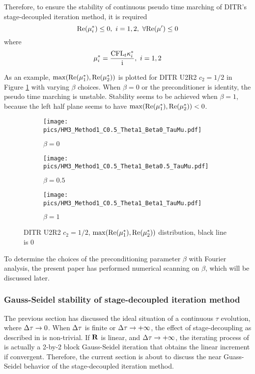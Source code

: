 Therefore, to ensure the stability of continuous pseudo time
marching of DITR's stage-decoupled iteration method, it is
required
\begin{equation}
    \mathrm{Re}(\mu^*_i) \leq 0,\  i = 1,2,\  \forall \mathrm{Re}(\mu') \leq 0
\end{equation}
where
\begin{equation}
    \mu^*_i = \frac{\text{CFL}_t\kappa^*_i}{\mathrm{i}},\ i=1,2
\end{equation}

As an example, $\max(\mathrm{Re}(\mu^*_1),\mathrm{Re}(\mu^*_2))$ is plotted for
DITR U2R2 $c_2=1/2$ in Figure \ref{fig:MuU2R2} with varying $\beta$ choices.
When $\beta = 0$ or the preconditioner is identity, the pseudo time marching is
unstable. Stability seems to be achieved when $\beta = 1$, because
the left half plane seems to have $\max(\mathrm{Re}(\mu^*_1),\mathrm{Re}(\mu^*_2)) < 0$.
\begin{figure}[htbp]
    \centering
    \begin{subfigure}{0.33\textwidth}
        \texttt{[image: pics/HM3\_Method1\_C0.5\_Theta1\_Beta0\_TauMu.pdf]}
        \caption[]{$\beta = 0$}
    \end{subfigure}\hfill
    \begin{subfigure}{0.33\textwidth}
        \texttt{[image: pics/HM3\_Method1\_C0.5\_Theta1\_Beta0.5\_TauMu.pdf]}
        \caption[]{$\beta = 0.5$}
    \end{subfigure}\hfill
    \begin{subfigure}{0.33\textwidth}
        \texttt{[image: pics/HM3\_Method1\_C0.5\_Theta1\_Beta1\_TauMu.pdf]}
        \caption[]{$\beta = 1$}
    \end{subfigure}
    \caption{DITR U2R2 $c_2=1/2$, $\max(\mathrm{Re}(\mu^*_1),\mathrm{Re}(\mu^*_2))$ distribution, black line is 0}
    \label{fig:MuU2R2}
\end{figure}

To determine the choices of the preconditioning parameter  $\beta$
with Fourier analysis, the
present paper has performed numerical scanning
on $\beta$, which will be discussed later.

\subsubsection{Gauss-Seidel stability of stage-decoupled iteration method}
\label{sssec:GSStability}

The previous section has discussed the ideal
situation of a continuous $\tau$ evolution, where
${\Delta} \tau \rightarrow 0$. When ${\Delta} \tau$ is finite
or ${\Delta} \tau \rightarrow +\infty$,
the effect of stage-decoupling as described in 
is non-trivial.
If $\mathbf{R}$ is linear, and ${\Delta} \tau \rightarrow +\infty$,
the iterating process of  is
actually a 2-by-2 block Gauss-Seidel iteration that obtains
the linear increment if convergent.
Therefore, the current section is about to discuss the
near Guass-Seidel behavior of the stage-decoupled iteration method.

